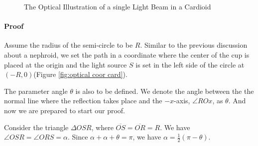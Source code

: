 \documentclass[a4paper]{article}
\begin{document}
\begin{figure}[!htbp] 
\centering 
{}
\caption{The Optical Illustration of a single Light Beam in a Cardioid} 
\end{figure}

\paragraph{Proof}
Assume the radius of the semi-circle to be $R$. Similar to the previous discussion about a nephroid, we set the path in a coordinate where the center of the cup is placed at the origin and the light source $S$ is set in the left side of the circle at $(-R,0)$(Figure \ref{fig:optical coor card}).

The parameter angle $\theta$ is also to be defined. We denote the angle between the the normal line where the reflection takes place and the $-x$-axis, $\angle ROx$, as $\theta$. And now we are prepared to start our proof.

Consider the triangle $\Delta OSR$, where $\overline{OS} = \overline{OR} = R$. We have $\angle OSR =\angle ORS = \alpha$. Since $\alpha+\alpha+\theta = \pi$, we have $\alpha = \frac{1}{2}(\pi-\theta)$.
\end{document}
